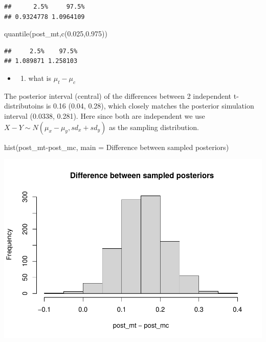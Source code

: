 \documentclass[
]{book}
\newenvironment{Shaded}{\begin{snugshade}}{\end{snugshade}}
\newcommand{\AttributeTok}[1]{\textcolor[rgb]{0.77,0.63,0.00}{#1}}
\newcommand{\FloatTok}[1]{\textcolor[rgb]{0.00,0.00,0.81}{#1}}
\newcommand{\FunctionTok}[1]{\textcolor[rgb]{0.00,0.00,0.00}{#1}}
\newcommand{\NormalTok}[1]{#1}
\newcommand{\SpecialCharTok}[1]{\textcolor[rgb]{0.00,0.00,0.00}{#1}}
\newcommand{\StringTok}[1]{\textcolor[rgb]{0.31,0.60,0.02}{#1}}
\providecommand{\tightlist}{%
  \setlength{\itemsep}{0pt}\setlength{\parskip}{0pt}}
\theoremstyle{definition}
\theoremstyle{definition}
\theoremstyle{definition}
\theoremstyle{definition}
\theoremstyle{remark}
\begin{document}
\begin{verbatim}
##      2.5%     97.5% 
## 0.9324778 1.0964109
\end{verbatim}

\begin{Shaded}
\begin{Highlighting}[]
        \FunctionTok{quantile}\NormalTok{(post\_mt,}\FunctionTok{c}\NormalTok{(}\FloatTok{0.025}\NormalTok{,}\FloatTok{0.975}\NormalTok{))}
\end{Highlighting}
\end{Shaded}

\begin{verbatim}
##     2.5%    97.5% 
## 1.089871 1.258103
\end{verbatim}

\begin{itemize}
\item
  \begin{enumerate}
  \def\labelenumi{(\alph{enumi})}
  \setcounter{enumi}{1}
  \tightlist
  \item
    what is \(\mu_t - \mu_c\)
  \end{enumerate}
\end{itemize}

The posterior interval (central) of the differences between 2 independent t-distributoins is 0.16 (0.04, 0.28), which closely matches the posterior simulation interval (0.0338, 0.281). Here since both are independent we use \(X-Y\sim N(\mu_x-\mu_y, sd_x+sd_y)\) as the sampling distribution.

\begin{Shaded}
\begin{Highlighting}[]
 \FunctionTok{hist}\NormalTok{(post\_mt}\SpecialCharTok{{-}}\NormalTok{post\_mc, }\AttributeTok{main =} \StringTok{\textquotesingle{} Difference between sampled posteriors\textquotesingle{}}\NormalTok{)}
\end{Highlighting}
\end{Shaded}

\includegraphics{_main_files/figure-latex/unnamed-chunk-32-1.pdf}
\end{document}
